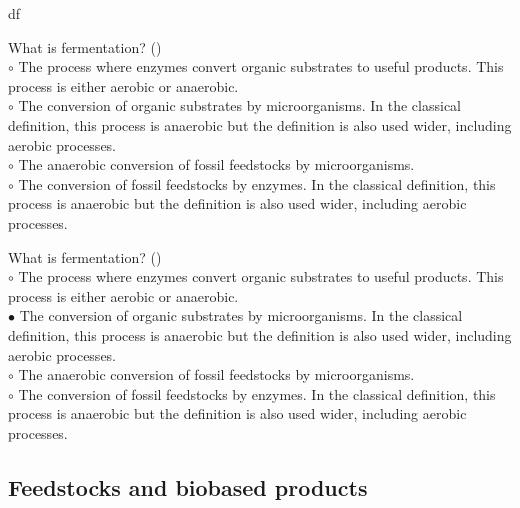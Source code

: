 df\documentclass[]{beamer}
\begin{document}
\begin{CJK}{UTF8}{gbsn}
\begin{frame}[shrink] {}
\addtocounter{questions}{1}
\color{blue}
What is fermentation?
({})\\
\color{black}
\setlength{\parindent}{-0.4cm}
{\color{red}$\circ$} The process where enzymes convert organic substrates to useful products. This process is either aerobic or anaerobic.  \\
{\color{red}$\circ$}  The conversion of organic substrates by microorganisms. In the classical definition, this process is anaerobic but the definition is also used wider, including aerobic processes.  \\
{\color{red}$\circ$} The anaerobic conversion of fossil feedstocks by microorganisms.  \\
{\color{red}$\circ$} The conversion of fossil feedstocks by enzymes. In the classical definition, this process is anaerobic but the definition is also used wider, including aerobic processes.  \\

\end{frame}
\begin{frame}[shrink] {}
\addtocounter{answers}{1}
\color{blue}
What is fermentation?
({})\\
\color{black}
\setlength{\parindent}{-0.4cm}
{\color{red}$\circ$} The process where enzymes convert organic substrates to useful products. This process is either aerobic or anaerobic.  \\
{\color{red}$\bullet$} The conversion of organic substrates by microorganisms. In the classical definition, this process is anaerobic but the definition is also used wider, including aerobic processes.  \\
{\color{red}$\circ$} The anaerobic conversion of fossil feedstocks by microorganisms.  \\
{\color{red}$\circ$} The conversion of fossil feedstocks by enzymes. In the classical definition, this process is anaerobic but the definition is also used wider, including aerobic processes.  \\

\end{frame}
\subsection{Feedstocks and biobased products }
\setcounter{questions}{0}
\setcounter{answers}{0}



\end{CJK}
\end{document}
